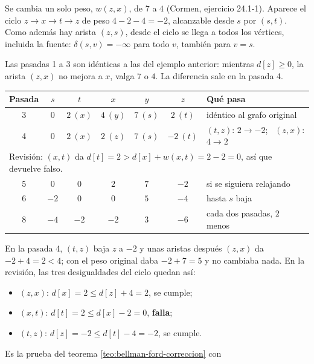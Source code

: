 \documentclass[11pt,letterpaper]{article}
\begin{document}
\begin{ejemplo}
  \label{ej:bellman-ford-ciclo-negativo}
  Se cambia un solo peso, $w(z, x)$, de $7$ a $4$ (Cormen, ejercicio
  24.1-1). Aparece el ciclo $z \to x \to t \to z$ de peso
  $4 - 2 - 4 = -2$, alcanzable desde $s$ por $(s, t)$. Como además
  hay arista $(z, s)$, desde el ciclo se llega a todos los vértices,
  incluida la fuente: $\delta(s, v) = -\infty$ para todo $v$, también
  para $v = s$.

  Las pasadas 1 a 3 son idénticas a las del ejemplo anterior: mientras
  $d[z] \ge 0$, la arista $(z, x)$ no mejora a $x$, valga $7$ o $4$.
  La diferencia sale en la pasada 4.
  \begin{center}
  \small
  \begin{tabular}{ccccccl}
    \toprule
    \textbf{Pasada} & $s$ & $t$ & $x$ & $y$ & $z$
      & \textbf{Qué pasa} \\
    \midrule
    3 & $0$ & $2\ (x)$ & $4\ (y)$ & $7\ (s)$ & $2\ (t)$
      & idéntico al grafo original \\
    4 & $0$ & $2\ (x)$ & $2\ (z)$ & $7\ (s)$ & $-2\ (t)$
      & $(t, z)$: $2 \to -2$; \ $(z, x)$: $4 \to 2$ \\
    \midrule
    \multicolumn{7}{l}{Revisión: $(x, t)$ da
      $d[t] = 2 > d[x] + w(x, t) = 2 - 2 = 0$, así que devuelve
      falso.} \\
    \midrule
    5 & $0$ & $0$ & $2$ & $7$ & $-2$ & si se siguiera relajando \\
    6 & $-2$ & $0$ & $0$ & $5$ & $-4$ & hasta $s$ baja \\
    8 & $-4$ & $-2$ & $-2$ & $3$ & $-6$
      & cada dos pasadas, $2$ menos \\
    \bottomrule
  \end{tabular}
  \end{center}
  En la pasada 4, $(t, z)$ baja $z$ a $-2$ y unas aristas después
  $(z, x)$ da $-2 + 4 = 2 < 4$; con el peso original daba
  $-2 + 7 = 5$ y no cambiaba nada. En la revisión, las tres
  desigualdades del ciclo quedan así:
  \begin{itemize}[itemsep=0.1em]
    \item $(z, x)$: $d[x] = 2 \le d[z] + 4 = 2$, se cumple;
    \item $(x, t)$: $d[t] = 2 \le d[x] - 2 = 0$, \textbf{falla};
    \item $(t, z)$: $d[z] = -2 \le d[t] - 4 = -2$, se cumple.
  \end{itemize}
  Es la prueba del teorema \ref{teo:bellman-ford-correccion} con

\end{ejemplo}
\end{document}
